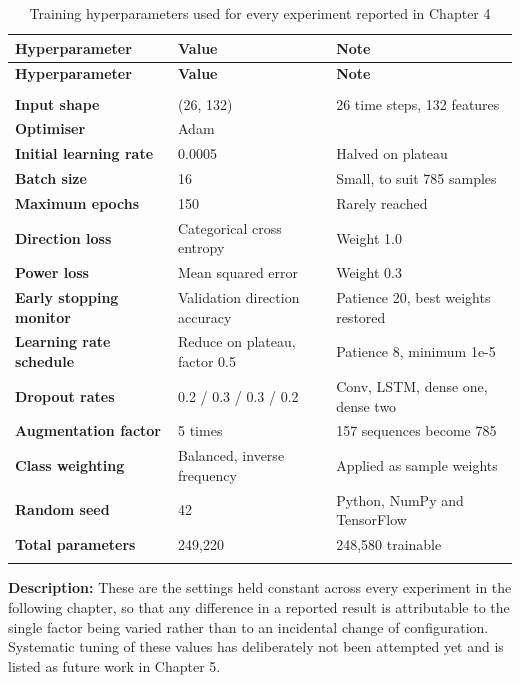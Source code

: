 \renewcommand{\arraystretch}{1.25}
\small
\begin{longtable}{|>{\bfseries}p{5.2cm}|p{4.0cm}|p{4.0cm}|}
\hline
\textbf{Hyperparameter} & \textbf{Value} & \textbf{Note} \\ \hline
\endfirsthead
\hline
\textbf{Hyperparameter} & \textbf{Value} & \textbf{Note} \\ \hline
\endhead
\hline
\multicolumn{3}{r}{\textit{Continued on next page}} \\
\hline
\endfoot
\hline
\endlastfoot
Input shape & (26, 132) & 26 time steps, 132 features \\ \hline
Optimiser & Adam & \\ \hline
Initial learning rate & 0.0005 & Halved on plateau \\ \hline
Batch size & 16 & Small, to suit 785 samples \\ \hline
Maximum epochs & 150 & Rarely reached \\ \hline
Direction loss & Categorical cross entropy & Weight 1.0 \\ \hline
Power loss & Mean squared error & Weight 0.3 \\ \hline
Early stopping monitor & Validation direction accuracy & Patience 20, best weights restored \\ \hline
Learning rate schedule & Reduce on plateau, factor 0.5 & Patience 8, minimum 1e-5 \\ \hline
Dropout rates & 0.2 / 0.3 / 0.3 / 0.2 & Conv, LSTM, dense one, dense two \\ \hline
Augmentation factor & 5 times & 157 sequences become 785 \\ \hline
Class weighting & Balanced, inverse frequency & Applied as sample weights \\ \hline
Random seed & 42 & Python, NumPy and TensorFlow \\ \hline
Total parameters & 249,220 & 248,580 trainable \\ \hline
\caption{Training hyperparameters used for every experiment reported in Chapter 4}
\label{tab:hyperparams}
\end{longtable}
\normalsize

\noindent
\textbf{Description:} These are the settings held constant across every experiment in the following chapter, so that any difference in a reported result is attributable to the single factor being varied rather than to an incidental change of configuration. Systematic tuning of these values has deliberately not been attempted yet and is listed as future work in Chapter 5.

